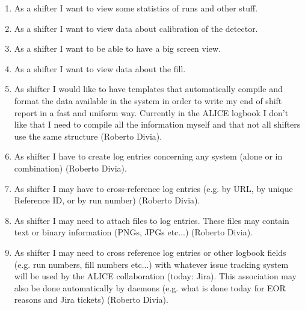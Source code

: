 \begin{enumerate}
  \item As a shifter I want to view some statistics of runs and other stuff.
  \item As a shifter I want to view data about calibration of the detector.
  \item As a shifter I want to be able to have a big screen view.
  \item As a shifter I want to view data about the fill.
  \item As shifter I would like to have templates that automatically compile  and format the data available in the system in order to write my end of shift report in a fast and uniform way. Currently in the ALICE logbook I don't like that I need to compile all the information myself and that not all shifters use the same structure (Roberto Divia).
  \item As shifter I have to create log entries concerning any system (alone or in combination) (Roberto Divia).
  \item As shifter I may have to cross-reference log entries (e.g. by URL, by unique Reference ID, or by run number)  (Roberto Divia).
  \item  As shifter I may need to attach files to log entries. These files may contain text or binary information (PNGs, JPGs etc...) (Roberto Divia).
  \item As shifter I may need to cross reference log entries or other logbook fields (e.g. run numbers, fill numbers etc...) with whatever issue tracking system will be used by the ALICE collaboration (today: Jira). This association may also be done automatically by daemons (e.g. what is done today for EOR reasons and Jira tickets) (Roberto Divia).

\end{enumerate}

